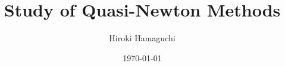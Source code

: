 \documentclass[12pt,a4paper,dvipdfmx]{article}
\begin{document}
\title{Study of Quasi-Newton Methods}
\author{Hiroki Hamaguchi }
\date{\today}
\maketitle











\end{document}
